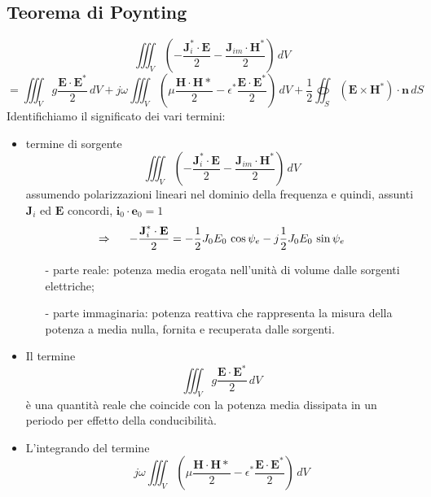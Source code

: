 \documentclass[a4paper]{article}
\begin{document}
\subsection*{Teorema di Poynting}
\begin{equation*}
\iiint_V(-\frac{\textbf{J}_i^*\cdot\textbf{E}}{2}-\frac{\textbf{J}_{im}\cdot\textbf{H}^*}{2})\,dV
\end{equation*}
\begin{equation*}
=\iiint_Vg\frac{\textbf{E}\cdot\textbf{E}^*}{2}\,dV+j\omega\iiint_V(\mu\frac{\textbf{H}\cdot\textbf{H}*}{2}-\epsilon^*\frac{\textbf{E}\cdot\textbf{E}^*}{2})\,dV+\frac{1}{2}\oiint_S(\textbf{E}\times\textbf{H}^*)\cdot\textbf{n}\,dS
\end{equation*}
Identifichiamo il significato dei vari termini:
\begin{itemize}
\item termine di sorgente
\begin{equation*}
\iiint_V(-\frac{\textbf{J}_i^*\cdot\textbf{E}}{2}-\frac{\textbf{J}_{im}\cdot\textbf{H}^*}{2})\,dV
\end{equation*}
assumendo polarizzazioni lineari nel dominio della frequenza e quindi, assunti $\textbf{J}_i$ ed $\textbf{E}$ concordi, $\textbf{i}_0\cdot\textbf{e}_0=1$
\begin{equation*}
\Rightarrow\hspace{5mm}-\frac{\textbf{J}_i^*\cdot\textbf{E}}{2}=-\frac{1}{2}J_0E_0\,\cos\psi_e-j\frac{1}{2}J_0E_0\,\sin\psi_e
\end{equation*}
\begin{itemize}
\item[-] parte reale: potenza media erogata nell'unità di volume dalle sorgenti elettriche;
\item[-] parte immaginaria: potenza reattiva che rappresenta la misura della potenza a media nulla, fornita e recuperata dalle sorgenti.
\end{itemize}
\item Il termine
\begin{equation*}
\iiint_Vg\frac{\textbf{E}\cdot\textbf{E}^*}{2}\,dV
\end{equation*}
è una quantità reale che coincide con la potenza media dissipata in un periodo per effetto della conducibilità.
\item L'integrando del termine
\begin{equation*}
j\omega\iiint_V(\mu\frac{\textbf{H}\cdot\textbf{H}*}{2}-\epsilon^*\frac{\textbf{E}\cdot\textbf{E}^*}{2})\,dV
\end{equation*}

\end{itemize}
\end{document}
